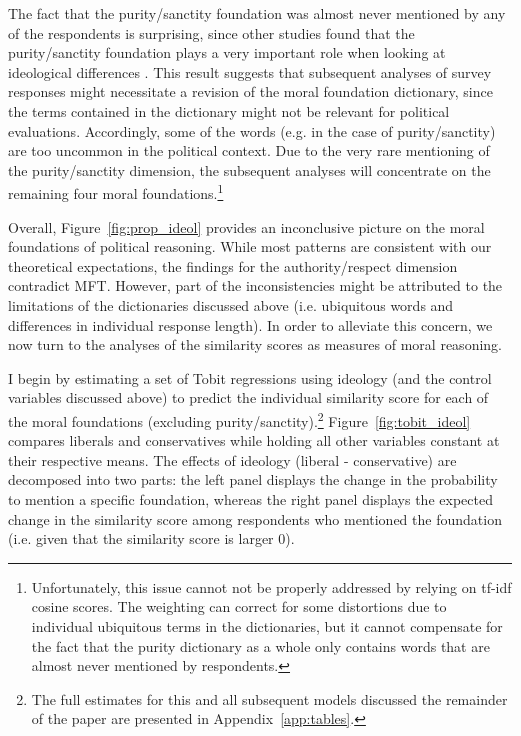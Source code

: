 \documentclass[12pt]{article}
\begin{document}
The fact that the purity/sanctity foundation was almost never mentioned by any of the respondents is surprising, since other studies found that the purity/sanctity foundation plays a very important role when looking at ideological differences \citep{koleva2012tracing}. This result suggests that subsequent analyses of survey responses might necessitate a revision of the moral foundation dictionary, since the terms contained in the dictionary might not be relevant for political evaluations. Accordingly, some of the words (e.g. in the case of purity/sanctity) are too uncommon in the political context. Due to the very rare mentioning of the purity/sanctity dimension, the subsequent analyses will concentrate on the remaining four moral foundations.\footnote{Unfortunately, this issue cannot not be properly addressed by relying on tf-idf cosine scores. The weighting can correct for some distortions due to individual ubiquitous terms in the dictionaries, but it cannot compensate for the fact that the purity dictionary as a whole only contains words that are almost never mentioned by respondents.}

Overall, Figure~\ref{fig:prop_ideol} provides an inconclusive picture on the moral foundations of political reasoning. While most patterns are consistent with our theoretical expectations, the findings for the authority/respect dimension contradict MFT. However, part of the inconsistencies might be attributed to the limitations of the dictionaries discussed above (i.e. ubiquitous words and differences in individual response length). In order to alleviate this concern, we now turn to the analyses of the similarity scores as measures of moral reasoning.

I begin by estimating a set of Tobit regressions using ideology (and the control variables discussed above) to predict the individual similarity score for each of the moral foundations (excluding purity/sanctity).\footnote{The full estimates for this and all subsequent models discussed the remainder of the paper are presented in Appendix~\ref{app:tables}.} Figure~\ref{fig:tobit_ideol} compares liberals and conservatives while holding all other variables constant at their respective means. The effects of ideology (liberal - conservative) are decomposed into two parts: the left panel displays the change in the probability to mention a specific foundation, whereas the right panel displays the expected change in the similarity score among respondents who mentioned the foundation (i.e. given that the similarity score is larger 0).
\end{document}
